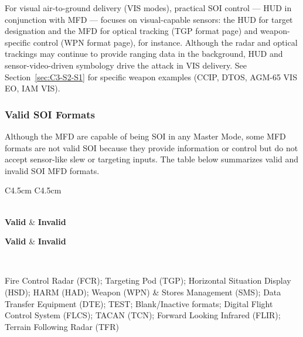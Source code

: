 \documentclass[11pt, a4paper, twoside]{report}
\begin{document}
For visual air-to-ground delivery (VIS modes), practical SOI control --- HUD in conjunction with MFD --- focuses on visual-capable sensors: the HUD for target designation and the MFD for optical tracking (TGP format page) and weapon-specific control (WPN format page), for instance. Although the radar and optical trackings may continue to provide ranging data in the background, HUD and sensor-video-driven symbology drive the attack in VIS delivery. See Section~\ref{sec:C3-S2-S1} for specific weapon examples (CCIP, DTOS, AGM-65 VIS EO, IAM VIS).

\subsubsection{Valid SOI Formats}
\label{sec:C3-S1-S1-S1}

Although the MFD are capable of being SOI in any Master Mode, some MFD formats are not valid SOI because they provide information or control but do not accept sensor-like slew or targeting inputs. The table below summarizes valid and invalid SOI MFD formats.

\begin{longtable}{C{4.5cm} C{4.5cm}}
	\caption{Valid and Invalid SOI MFD Formats \label{tab:C3-S1-MFD-format}}\\
	
	\textbf{\color{white}Valid} & \textbf{\color{white}Invalid}\\
	\endfirsthead
	
	\textbf{\color{white}Valid} & \textbf{\color{white}Invalid}\\
	\endhead
	
	\\
	\endfoot
	
	\endlastfoot
	
	Fire Control Radar (FCR); Targeting Pod (TGP); Horizontal Situation Display (HSD); HARM (HAD); Weapon (WPN) & Stores Management (SMS); Data Transfer Equipment (DTE); TEST; Blank/Inactive formats; Digital Flight Control System (FLCS); TACAN (TCN); Forward Looking Infrared (FLIR); Terrain Following Radar (TFR)
\end{longtable}

\end{document}
